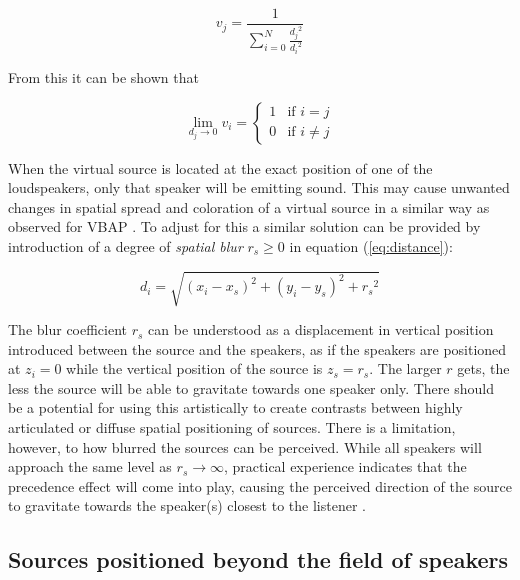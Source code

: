 \documentclass[twoside,10pt]{article}
\begin{document}
\begin{equation}
v_{j} = \frac{1}{\sum_{i=0}^{N} \frac{{d_{j}}^2}{{d_{i}}^2}}
\end{equation}

From this it can be shown that

\begin{equation} \label{eq:distance_zero}
\lim_{d_{j} \rightarrow 0} v_{i} = 
\left\{ \begin{array}{ll} 
1 & \textrm{if $i=j$}\\ 
0 & \textrm{if $i \ne j$}
\end{array} \right.
\end{equation}

When the virtual source is located at the exact position of one of the loudspeakers, only that speaker will be emitting sound. This may cause unwanted changes in spatial spread and coloration of a virtual source in a similar way as observed for VBAP \cite{Pulkki:1999vbap}. To adjust for this a similar solution can be provided by introduction of a degree of \textit{spatial blur} $r_{s} \ge 0$ in equation (\ref{eq:distance}):

\begin{equation} \label{eq:mod_distance}
d_{i} = \sqrt{ {(x_{i} - x_{s})}^2 + {(y_{i} - y_{s})}^2 + {r_{s}}^2}
\end{equation}

The blur coefficient $r_{s}$ can be understood as a displacement in vertical position introduced between the source and the speakers, as if the speakers are positioned at $z_{i}=0$ while the vertical position of the source is $z_{s}=r_{s}$. The larger $r$ gets, the less the source will be able to gravitate towards one speaker only. There should be a potential for using this artistically to create contrasts between highly articulated or diffuse spatial positioning of sources.  There is a limitation, however, to how blurred the sources can be perceived.  While all speakers will approach the same level as $ r_{s} \rightarrow \infty $, practical experience indicates that the precedence effect will come into play, causing the perceived direction of the source to gravitate towards the speaker(s) closest to the listener \cite{Litovsky:1999precedence_effect}.




\subsection{Sources positioned beyond the field of speakers}
\end{document}
